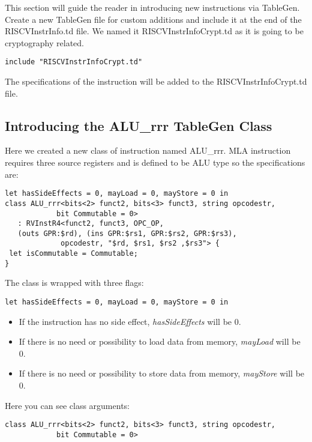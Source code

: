 This section will guide the reader in introducing new instructions via TableGen.
Create a new TableGen file for custom additions and include it at the end of the RISCVInstrInfo.td file. We named it RISCVInstrInfoCrypt.td as it is going to be cryptography related.
\begin{lstlisting}[caption= Include file]
include "RISCVInstrInfoCrypt.td"
\end{lstlisting}

The specifications of the instruction will be added to the RISCVInstrInfoCrypt.td file.

\subsection{Introducing the ALU\_rrr TableGen Class}\label{sec:alurrr}

Here we created a new class of instruction named ALU\_rrr. MLA instruction requires three source registers and is defined to be ALU type so the specifications are:

\begin{lstlisting}[caption={ALU\_rrr class definition},label={lst:ALU_rrr}]
let hasSideEffects = 0, mayLoad = 0, mayStore = 0 in
class ALU_rrr<bits<2> funct2, bits<3> funct3, string opcodestr,
            bit Commutable = 0>
   : RVInstR4<funct2, funct3, OPC_OP, 
   (outs GPR:$rd), (ins GPR:$rs1, GPR:$rs2, GPR:$rs3),
             opcodestr, "$rd, $rs1, $rs2 ,$rs3"> {
 let isCommutable = Commutable;
}
\end{lstlisting}
The class is wrapped with three flags:
\begin{lstlisting}
let hasSideEffects = 0, mayLoad = 0, mayStore = 0 in
\end{lstlisting}

\begin{itemize}
    \item If the instruction has no side effect, \textit{hasSideEffects} will be 0.
    \item If there is no need or possibility to load data from memory, \textit{mayLoad} will be 0.
    \item If there is no need or possibility to store data from memory, \textit{mayStore} will be 0.
\end{itemize}


Here you can see class arguments:
\begin{lstlisting}
class ALU_rrr<bits<2> funct2, bits<3> funct3, string opcodestr,
            bit Commutable = 0>
\end{lstlisting}


